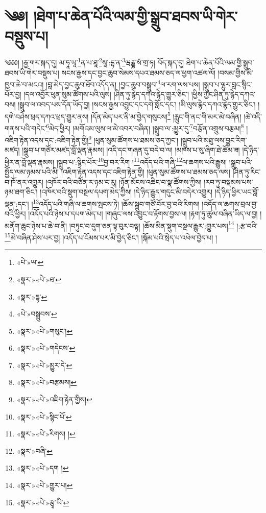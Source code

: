\chapter{༄༅། །ཐེག་པ་ཆེན་པོའི་ལམ་གྱི་སྒྲུབ་ཐབས་ཡི་གེར་བསྡུས་པ།}༄༅༅། །རྒྱ་གར་སྐད་དུ། མ་ཧཱ་ཡཱ་\footnote{«པེ་»ཡ་}ན་པ་ཐཱ་\footnote{«སྣར་»«པེ་»ཐ་}སཱ་:དྷ་ན་\footnote{«སྣར་»དྷ་}ཝརྞྞ་སཾ་གྲ་ཧ། བོད་སྐད་དུ། ཐེག་པ་ཆེན་པོའི་ལམ་གྱི་སྒྲུབ་ཐབས་ཡི་གེར་བསྡུས་པ། སངས་རྒྱས་དང་བྱང་ཆུབ་སེམས་དཔའ་ཐམས་ཅད་ལ་ཕྱག་འཚལ་ལོ། །བསམ་གྱིས་མི་ཁྱབ་ཆེ་བ་མངའ། །བླ་མེད་བྱང་ཆུབ་ཐོབ་འདོད་ན། །བྱང་ཆུབ་བསྒྲུབ་\footnote{«པེ་»བསྒྲུབས་}ལ་རག་ལས་པས། །སྒྲུབ་པ་ལྷུར་བླང་སྙིང་པོར་བྱ། །དལ་འབྱོར་ཕུན་སུམ་ཚོགས་པའི་ལུས། །ཤིན་ཏུ་རྙེད་དཀའ་རྙེད་གྱུར་ཅིང་། །ཕྱིས་ཀྱང་ཤིན་ཏུ་རྙེད་དཀའ་བས། །སྒྲུབ་ལ་འབད་པས་དོན་ཡོད་བྱ། །སངས་རྒྱས་འབྱུང་དང་དགེ་སློང་དང་། །མི་ལུས་རྙེད་དཀའ་རྙེད་གྱུར་ཅིང་། །དགེ་བཤེས་ཕྲད་དཀའ་ཕྲད་གྱུར་ནས། །དོན་མེད་པར་ནི་མ་བྱེད་གསུངས།\footnote{«སྣར་»«པེ་»གསུང་།} །རླུང་གི་ནང་གི་མར་མེ་བཞིན། །ཚེ་འདི་གནས་པའི་གདེང་\footnote{«སྣར་»«པེ་»གདེངས་}མེད་ཕྱིར། །མགོའམ་ལུས་ལ་མེ་འབར་བཞིན། །སྒྲུབ་ལ་:མྱུར་དུ་\footnote{«སྣར་»«པེ་»མྱུར་དེ་}བརྩོན་འགྲུས་བརྩམ།\footnote{«སྣར་»«པེ་»བརྩམས།} །འཇིག་རྟེན་འདས་དང་:འཇིག་རྟེན་གྱི།\footnote{«སྣར་»«པེ་»འཇིག་རྟེན་གྱིས།} །ཕུན་སུམ་ཚོགས་པ་ཐམས་ཅད་ཀྱང་། །སྒྲུབ་པའི་མཐུ་ལས་བྱུང་རིག་མཛད། །སྒྲུབ་པ་གཙོར་མཛད་བློ་ལྡན་རྣམས། །འདི་དང་གཞན་དུ་བདེ་བ་ལ། །མཁས་པ་སུ་ཞིག་ཐེ་ཚོམ་ཟ། །དེ་ཉིད་ཕྱིར་ན་བློ་ལྡན་རྣམས། །སྒྲུབ་པ་:སྙིང་པོར་\footnote{«སྣར་»«པེ་»སྙིང་པོ་}བྱ་བར་རིག །\footnote{«སྣར་»«པེ་»རིགས། །}འདོད་པའི་གཞི་\footnote{«སྣར་»བཞི་}ལ་ཆགས་པའི་རྒྱུས། །སྒྲུབ་པའི་སྤྱོད་ལམ་ཉམས་པའི་མི། །འཇིག་རྟེན་འདས་དང་འཇིག་རྟེན་གྱི། །ཕུན་སུམ་ཚོགས་པ་ཐམས་ཅད་ལས། །ཤིན་ཏུ་རིང་བ་ཁོ་ནར་འགྱུར། །འཁོར་བའི་བཙོན་ར་ཉམ་ང་རུ། །ཉོན་མོངས་འཆིང་བ་སྣ་ཚོགས་ཀྱིས། །རབ་ཏུ་བསྡམས་པས་ཉམ་ཐག་ཅིང་། །འཁོར་བའི་སྡུག་བསྔལ་དཔག་མེད་ཀྱིས། །དེ་ཉིད་རྒྱུད་གདུང་མི་བདེར་འགྱུར། །དེ་ཉིད་ཕྱིར་ཡང་བློ་ལྡན་:དང་། །\footnote{«སྣར་»«པེ་»དག །}འདོད་པའི་གཞི་ལ་ཆགས་སྤངས་ཏེ། །ཆོས་སྒྲུབ་གཙོ་བོར་བྱ་བའི་རིགས། །འདོད་ལ་ཆགས་བྲལ་བྱ་བའི་ཕྱིར། །འདོད་པའི་ཉེས་པ་དཔག་མེད་པ། །གཞུང་ལས་འབྱུང་བ་རྟོགས་བྱས་ལ། །རྟག་ཏུ་ཚུལ་བཞིན་ཡིད་ལ་བྱ། །མནོག་ཆུང་ཉེས་པ་ཆེ་བ་ནི། །བཏུང་བ་དུག་ཅན་ལྟ་བུར་བལྟ། །ཆོས་མིན་སྡུག་བསྔལ་རྒྱུར་:གྱུར་པས།\footnote{«སྣར་»«པེ་»གྱུར་པ།} །:རྩ་བའི་\footnote{«སྣར་»«པེ་»རྩྭ་ཡི་}མེ་བཞིན་ཤེས་པར་བྱ། །འདོད་པ་ངོམས་པར་མི་བྱེད་ཅིང་། །སྐོམ་པའི་སྲེད་པ་འཕེལ་བྱེད་པ། །
